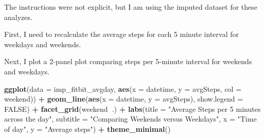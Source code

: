 \documentclass[]{article}
\newenvironment{Shaded}{\begin{snugshade}}{\end{snugshade}}
\newcommand{\KeywordTok}[1]{\textcolor[rgb]{0.13,0.29,0.53}{\textbf{#1}}}
\newcommand{\DataTypeTok}[1]{\textcolor[rgb]{0.13,0.29,0.53}{#1}}
\newcommand{\DecValTok}[1]{\textcolor[rgb]{0.00,0.00,0.81}{#1}}
\newcommand{\StringTok}[1]{\textcolor[rgb]{0.31,0.60,0.02}{#1}}
\newcommand{\CommentTok}[1]{\textcolor[rgb]{0.56,0.35,0.01}{\textit{#1}}}
\newcommand{\OtherTok}[1]{\textcolor[rgb]{0.56,0.35,0.01}{#1}}
\newcommand{\OperatorTok}[1]{\textcolor[rgb]{0.81,0.36,0.00}{\textbf{#1}}}
\newcommand{\NormalTok}[1]{#1}
\begin{document}
The instructions were not explicit, but I am using the imputed dataset
for these analyzes.

First, I need to recalculate the average steps for each 5 minute
interval for weekdays and weekends.

\begin{Shaded}
\end{Shaded}

Next, I plot a 2-panel plot comparing steps per 5-minute interval for
weekends and weekdays.

\begin{Shaded}
\begin{Highlighting}[]
\KeywordTok{ggplot}\NormalTok{(}\DataTypeTok{data =}\NormalTok{ imp_fitbit_avgday, }\KeywordTok{aes}\NormalTok{(}\DataTypeTok{x =}\NormalTok{ datetime, }\DataTypeTok{y =}\NormalTok{ avgSteps, }\DataTypeTok{col =}\NormalTok{ weekend)) }\OperatorTok{+}
\StringTok{  }\KeywordTok{geom_line}\NormalTok{(}\KeywordTok{aes}\NormalTok{(}\DataTypeTok{x =}\NormalTok{ datetime, }\DataTypeTok{y =}\NormalTok{ avgSteps), }\DataTypeTok{show.legend =} \OtherTok{FALSE}\NormalTok{) }\OperatorTok{+}
\StringTok{  }\KeywordTok{facet_grid}\NormalTok{(weekend}\OperatorTok{~}\NormalTok{.) }\OperatorTok{+}
\StringTok{  }\KeywordTok{labs}\NormalTok{(}\DataTypeTok{title =} \StringTok{"Average Steps per 5 minutes across the day"}\NormalTok{,}
       \DataTypeTok{subtitle =} \StringTok{"Comparing Weekends versus Weekdays"}\NormalTok{,}
       \DataTypeTok{x =} \StringTok{"Time of day"}\NormalTok{, }
       \DataTypeTok{y =} \StringTok{"Average steps"}\NormalTok{)  }\OperatorTok{+}
\StringTok{      }\KeywordTok{theme_minimal}\NormalTok{()}
\end{Highlighting}
\end{Shaded}
\end{document}
